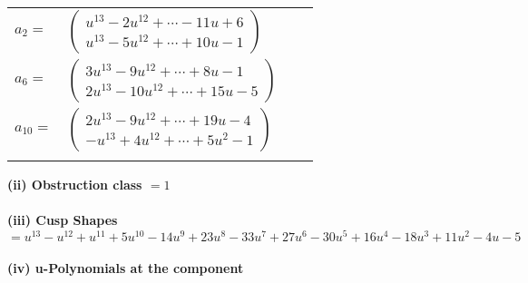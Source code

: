 \documentclass[1p]{elsarticle_modified}
\theoremstyle{definition}
\begin{document}
\begin{tabular}{m{7pt} m{180pt} m{7pt} m{180pt} }
\flushright $a_{2}=$&$\begin{pmatrix}u^{13}-2 u^{12}+\cdots-11 u+6\\u^{13}-5 u^{12}+\cdots+10 u-1\end{pmatrix}$ \\
\flushright $a_{6}=$&$\begin{pmatrix}3 u^{13}-9 u^{12}+\cdots+8 u-1\\2 u^{13}-10 u^{12}+\cdots+15 u-5\end{pmatrix}$ \\
\flushright $a_{10}=$&$\begin{pmatrix}2 u^{13}-9 u^{12}+\cdots+19 u-4\\- u^{13}+4 u^{12}+\cdots+5 u^2-1\end{pmatrix}$\\&\end{tabular}
\flushleft \textbf{(ii) Obstruction class $= 1$}\\~\\
\flushleft \textbf{(iii) Cusp Shapes $= u^{13}- u^{12}+u^{11}+5 u^{10}-14 u^9+23 u^8-33 u^7+27 u^6-30 u^5+16 u^4-18 u^3+11 u^2-4 u-5$}\\~\\
\newpage\renewcommand{\arraystretch}{1}
\flushleft \textbf{(iv) u-Polynomials at the component}\newline \\
\end{document}
